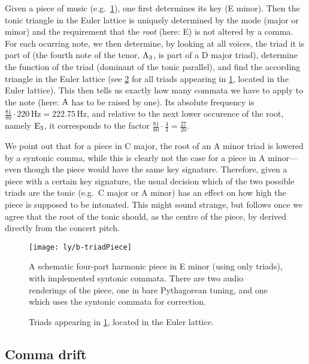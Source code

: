 \documentclass[british,11pt]{scrartcl}
\begin{document}
Given a piece of music (e.g.\ \cref{fig:triadPiece}), one first determines its
key (E minor).  Then the tonic triangle in the Euler lattice is uniquely
determined by the mode (major or minor) and the requirement that the \emph{root}
(here: E) is not altered by a comma. For each ocurring note, we then determine,
by looking at all voices, the triad it is part of (the fourth note of the tenor,
$\text{A}_3$, is part of a D major triad), determine the function of the triad
(dominant of the tonic parallel), and find the according triangle in the Euler
lattice (see \cref{fig:chordsLattice} for all triads appearing in
\cref{fig:triadPiece}, located in the Euler lattice). This then tells us exactly
how many commata we have to apply to the note (here: $\text{A}$ has to be raised by
one). Its absolute frequency is
$\frac{81}{80}\cdot 220\,\text{Hz}=222.75\,\text{Hz}$, and relative to the next
lower occurence of the root, namely $\text{E}_3$, it corresponds to the factor
$\frac{81}{80}\cdot \frac{4}{3}=\frac{27}{20}$.

We point out that for a piece in C major, the root of an A minor triad is
lowered by a syntonic comma, while this is clearly not the case for a piece in A
minor—even though the piece would have the same key signature. Therefore, given
a piece with a certain key signature, the usual decision which of the two
possible triads are the tonic (e.g.\ C major or A minor) has an effect on how
high the piece is supposed to be intonated.  This might sound strange, but
follows once we agree that the root of the tonic should, as the centre of the
piece, by derived directly from the concert pitch.

\begin{figure}
  \centering
  \texttt{[image: ly/b-triadPiece]}
  \caption{A schematic four-part harmonic piece in E minor (using only triads),
    with im\-ple\-men\-ted syntonic commata.  There are two audio renderings of
    the piece, one in bare Pythagorean tuning, and one which uses the syntonic
    commata for correction.}\label{fig:triadPiece}
\end{figure}

\begin{figure}
  
  \caption{Triads appearing in \cref{fig:triadPiece}, located in the Euler
    lattice.}\label{fig:chordsLattice}
\end{figure}

\subsection{Comma drift}
\end{document}
